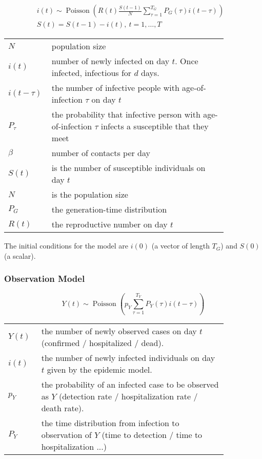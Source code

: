 \documentclass[11pt,a4paper,titlepage]{article}
\theoremstyle{definition}
\begin{document}
\begin{align}
    i(t) \sim \operatorname{Poisson} \left( R(t) \frac{S(t-1)}{N} \sum\limits_{\tau=1}^{T_G} {P_G(\tau)i(t-\tau)} \right) & \label{eq:aoi-i-poisson} \\
    S(t) = S(t - 1) - i(t), ~t=1,\ldots,T \label{eq:aoi-s-recurrence} &
\end{align}

\begin{tabular}{p{0.1\linewidth}p{0.75\linewidth}}
    $N$ & population size \\
    $i(t)$ &  number of newly infected on day $t$.
    Once infected, infectious for $d$ days. \\
    $i(t-\tau)$ & the number of infective people with age-of-infection $\tau$ on day $t$ \\
    $P_{\tau}$ & the probability that infective person with age-of-infection $\tau$ infects a susceptible that they meet \\
    $\beta$ & number of contacts per day \\
    $S(t)$ &  is the number of susceptible individuals on day $t$ \\
    $N$ & is the population size \\
    $P_G$ & the generation-time distribution \\
    $R(t)$ &  the reproductive number on day $t$ \\
\end{tabular}

The initial conditions for the model are $i(0)$ (a vector of length $T_G$) and $S(0)$ (a scalar).

\subsubsection{Observation Model}

\begin{equation}
    Y(t) \sim \operatorname { Poisson }\left(p_{Y} \sum_{\tau=1}^{T_{Y}} P_{Y}(\tau) i(t-\tau)\right)
\end{equation}

\begin{tabular}{p{0.1\linewidth}p{0.75\linewidth}}
    $Y(t)$ & the number of newly observed cases on day $t$ (confirmed / hospitalized / dead). \\
    $i(t)$ & the number of newly infected individuals on day $t$ given by the epidemic model. \\
    $p_Y$ & the probability of an infected case to be observed as $Y$ (detection rate / hospitalization rate / death rate). \\
    $P_Y$ & the time distribution from infection to observation of $Y$ (time to detection / time to hospitalization ...) \\
\end{tabular}
\end{document}
